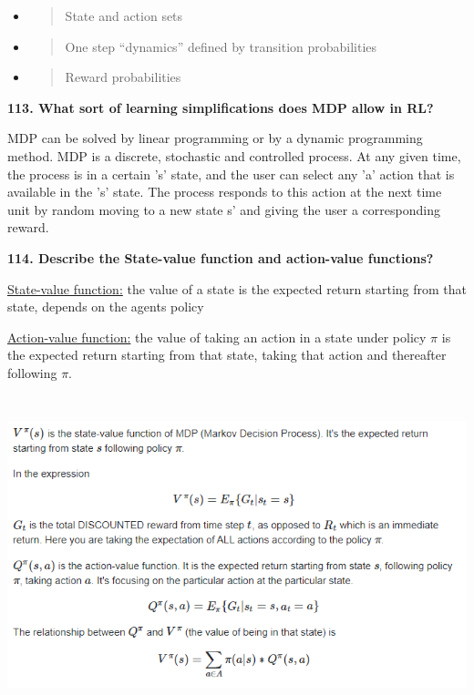 \begin{itemize}
\item
  \begin{quote}
  State and action sets
  \end{quote}
\item
  \begin{quote}
  One step ``dynamics'' defined by transition probabilities
  \end{quote}
\item
  \begin{quote}
  Reward probabilities
  \end{quote}
\end{itemize}

\textbf{113. What sort of learning simplifications does MDP allow in
RL?}

MDP can be solved by linear programming or by a dynamic programming
method. MDP is a discrete, stochastic and controlled process. At any
given time, the process is in a certain 's' state, and the user can
select any 'a' action that is available in the 's' state. The process
responds to this action at the next time unit by random moving to a new
state s' and giving the user a corresponding reward.

\textbf{114. Describe the State-value function and action-value
functions?}

\underline{State-value function:} the value of a state is the expected
return starting from that state, depends on the agents policy

\underline{Action-value function:} the value of taking an action in a
state under policy $\pi$ is the expected return starting from that state,
taking that action and thereafter following $\pi$.

\includegraphics[width=6.26772in,height=3.63889in]{media/image8.png}

